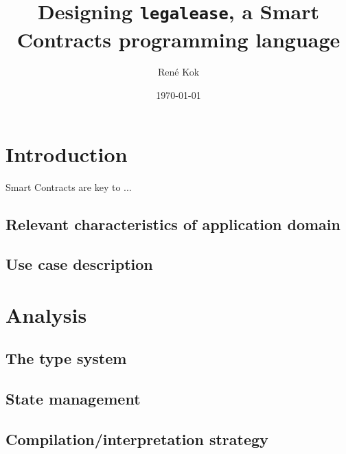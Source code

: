 \documentclass{uva-inf-article}
\title{Designing \texttt{legalease}, a Smart Contracts programming language}
\author{René Kok}
\date{\today}
\begin{document}
\maketitle




\section{Introduction}
Smart Contracts \cite{relevant-citation-1} are key to ...

\subsection{Relevant characteristics of application domain}

\subsection{Use case description}


\section{Analysis}
\subsection{The type system}
\subsection{State management}
\subsection{Compilation/interpretation strategy}
\end{document}
